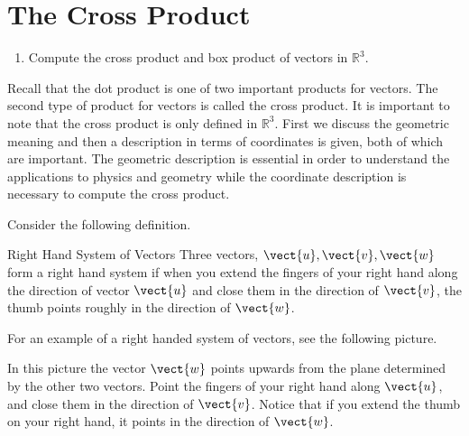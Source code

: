 \section{The Cross Product}

\begin{outcome}

\begin{enumerate}

\item[A.] Compute the cross product and box product of vectors in $\mathbb{R}^3$.
\end{enumerate}
\end{outcome}

Recall that the dot product is one of two important products for vectors. The second type of product for vectors is called the cross product. It is important to note that the 
cross product is only defined in $\mathbb{R}^{3}.$ 
First we discuss the geometric meaning and then a description in terms of
coordinates is given, both of which are important. 
The geometric description is essential in order to understand the
applications to physics and geometry while the coordinate description is necessary to compute the cross product.

Consider the following definition.

\begin{definition}{Right Hand System of Vectors}\label{def:righthand}
Three vectors, $\vect{u},\vect{v},\vect{w}$ form a right hand system if when you
extend the fingers of your right hand along the direction of vector $\vect{u}$ and
close them in the direction of $\vect{v}$, the thumb points roughly in the
direction of $\vect{w}$.
\end{definition}

For an example of a right handed system of vectors, see the following
picture.

\begin{center}
\end{center}

In this picture the vector $\vect{w}$ points upwards from the plane
determined by the other two vectors. Point the fingers of your right hand along $\vect{u}$, and 
close them in the direction of $\vect{v}$. Notice that if you extend the thumb on your right hand,
it points in the direction of $\vect{w}$.

